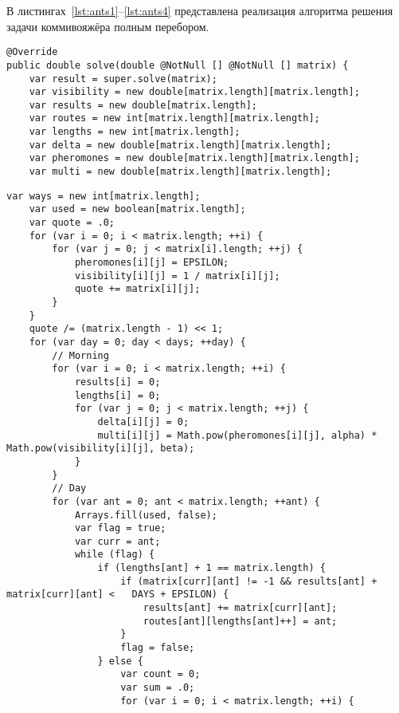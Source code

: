В листингах~\ref{lst:ants1}--\ref{lst:ants4} представлена реализация алгоритма решения задачи коммивояжёра полным перебором.

\begin{lstlisting}[label=lst:ants1,caption=Реализация муравьиного алгоритма (начало)]
@Override
public double solve(double @NotNull [] @NotNull [] matrix) {
	var result = super.solve(matrix);
	var visibility = new double[matrix.length][matrix.length];
	var results = new double[matrix.length];
	var routes = new int[matrix.length][matrix.length];
	var lengths = new int[matrix.length];
	var delta = new double[matrix.length][matrix.length];
	var pheromones = new double[matrix.length][matrix.length];
	var multi = new double[matrix.length][matrix.length];
\end{lstlisting}

\begin{lstlisting}[label=lst:ants2,caption=Реализация муравьиного алгоритма (продолжение)]
	var ways = new int[matrix.length];
	var used = new boolean[matrix.length];
	var quote = .0;
	for (var i = 0; i < matrix.length; ++i) {
		for (var j = 0; j < matrix[i].length; ++j) {
			pheromones[i][j] = EPSILON;
			visibility[i][j] = 1 / matrix[i][j];
			quote += matrix[i][j];
		}
	}
	quote /= (matrix.length - 1) << 1;
	for (var day = 0; day < days; ++day) {
		// Morning
		for (var i = 0; i < matrix.length; ++i) {
			results[i] = 0;
			lengths[i] = 0;
			for (var j = 0; j < matrix.length; ++j) {
				delta[i][j] = 0;
				multi[i][j] = Math.pow(pheromones[i][j], alpha) * 	Math.pow(visibility[i][j], beta);
			}
		}
		// Day
		for (var ant = 0; ant < matrix.length; ++ant) {
			Arrays.fill(used, false);
			var flag = true;
			var curr = ant;
			while (flag) {
				if (lengths[ant] + 1 == matrix.length) {
					if (matrix[curr][ant] != -1 && results[ant] + matrix[curr][ant] < 	DAYS + EPSILON) {
						results[ant] += matrix[curr][ant];
						routes[ant][lengths[ant]++] = ant;
					}
					flag = false;
				} else {
					var count = 0;
					var sum = .0;
					for (var i = 0; i < matrix.length; ++i) {
\end{lstlisting}

\clearpage

